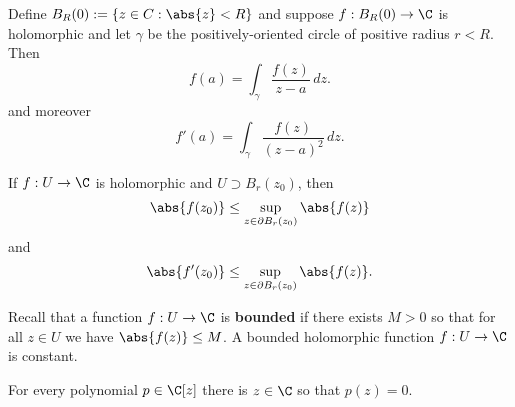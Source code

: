 \documentclass{homework}
\begin{document}
\begin{problem}\label{cauchy-integral-formula}Define $B_R(0) := \{ z \in C : \abs{z} < R \}$ and suppose
  $f : B_R(0) \to \C$ is holomorphic and let $\gamma$ be the
  positively-oriented circle of positive radius $r < R$.  Then
  \[
    f(a) = \int_\gamma \frac{f(z)}{z-a} \, dz.
  \]
  and moreover
  \[
    f'(a) = \int_\gamma \frac{f(z)}{(z-a)^2} \, dz.
  \]  
\end{problem}

\begin{problem}\label{cauchy-inequalities}If $f : U \to \C$ is
  holomorphic and $U \supset B_r(z_0)$, then
  \[
     \abs{f(z_0)} \leq \sup_{z \in \partial B_r(z_0)} \abs{f(z)}
   \]
   and
   \[
     \abs{f'(z_0)} \leq \sup_{z \in \partial B_r(z_0)} \abs{f(z)}. %
   \]
 \end{problem}

\begin{problem}\label{liouville-theorem}Recall that a function $f : U \to \C$ is
  \textbf{bounded} if there exists $M > 0$ so that for all $z \in U$
  we have $\abs{f(z)} \leq M$.  A bounded holomorphic function
  $f : U \to \C$ is constant.
\end{problem}

\begin{problem}
  For every polynomial $p \in \C[z]$ there is $z \in \C$ so that $p(z) = 0$.
\end{problem}
\end{document}
